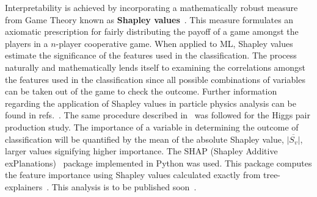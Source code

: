\par Interpretability is achieved by incorporating a mathematically robust measure from  Game Theory known as \textbf{Shapley values}~\cite{shapley1951notes}. This measure formulates an axiomatic prescription for fairly distributing the payoff of a game amongst the players in a $n$-player cooperative game. When applied to ML, Shapley values estimate the significance of the features used in the classification. The process naturally and mathematically lends itself to examining the correlations amongst the features used in the classification since all possible combinations of variables can be taken out of the game to check the outcome. Further information regarding the application of Shapley values in particle physics analysis can be found in refs.~\cite{Grojean:2020ech,Alvestad:2021sje,Cornell:2021gut}.  The same procedure described in~\cite{Grojean:2020ech} was followed for the Higgs pair production study. The importance of a variable in determining the outcome of classification will be quantified by the mean of the absolute Shapley value, $\overline{|S_v|}$, larger values signifying higher importance. The SHAP (Shapley Additive exPlanations)~\cite{NIPS2017_7062} package implemented in Python was used. This package computes the feature importance using Shapley values calculated exactly from  tree-explainers~\cite{2018arXiv180203888L, Lundberg:2020vt}. This analysis is to be published soon~\cite{IML}.
